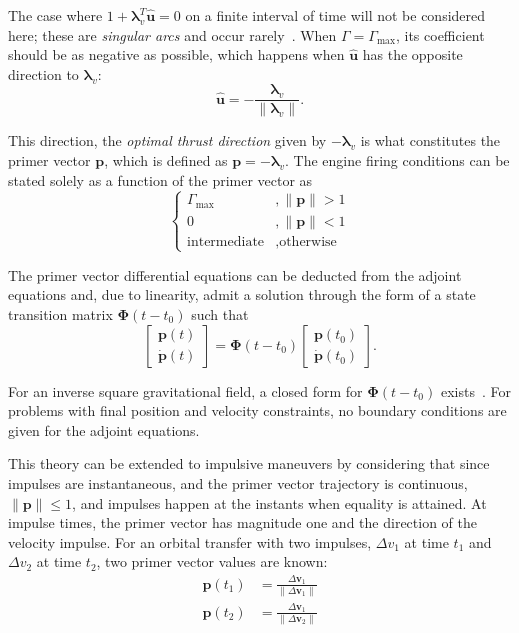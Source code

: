 The case where \(1 + \mathbf{\lambda}_v^T \hat{\mathbf{u}} = 0\) on a finite interval of time will not be considered here; these are \textit{singular arcs} and occur rarely~\cite{singular_arcs}. When \(\Gamma = \Gamma_{\max}\), its coefficient should be as negative as possible, which happens when \(\hat{\mathbf{u}}\) has the opposite direction to \(\mathbf{\lambda}_v\):
\begin{equation}
    \hat{\mathbf{u}} = - \frac{\mathbf{\lambda}_v}{\lVert \mathbf{\lambda}_v \rVert}.
\end{equation}

This direction, the \textit{optimal thrust direction} given by \(-\mathbf{\lambda}_v\) is what constitutes the primer vector \(\mathbf{p}\), which is defined as \(\mathbf{p} = -\mathbf{\lambda}_v\). The engine firing conditions can be stated solely as a function of the primer vector as~\cite{Conway_2010}
\begin{equation}
    \begin{cases}
        \Gamma_{\max}&, \lVert \mathbf{p} \rVert > 1 \\
        0&, \lVert \mathbf{p} \rVert < 1 \\
        \text{intermediate}&, \text{otherwise}
    \end{cases}
\end{equation}

The primer vector differential equations can be deducted from the adjoint equations and, due to linearity, admit a solution through the form of a state transition matrix \(\mathbf{\Phi}(t - t_0)\) such that
\begin{equation}
    \begin{bmatrix}
        \mathbf{p}(t) \\ \dot{\mathbf{p}}(t)
    \end{bmatrix} = \mathbf{\Phi}(t - t_0) \begin{bmatrix}
        \mathbf{p}(t_0) \\ \dot{\mathbf{p}}(t_0)
    \end{bmatrix}.
\end{equation}

For an inverse square gravitational field, a closed form for \(\mathbf{\Phi}(t-t_0)\) exists~\cite{glandorf_transition_matrix}. For problems with final position and velocity constraints, no boundary conditions are given for the adjoint equations.

This theory can be extended to impulsive maneuvers by considering that since impulses are instantaneous, and the primer vector trajectory is continuous, \(\lVert \mathbf{p} \rVert \leq 1\), and impulses happen at the instants when equality is attained. At impulse times, the primer vector has magnitude one and the direction of the velocity impulse. For an orbital transfer with two impulses, \(\Delta v_1\) at time \(t_1\) and \(\Delta v_2\) at time \(t_2\), two primer vector values are known:
\begin{align}
    \mathbf{p}(t_1) &= \frac{\Delta \mathbf{v}_1}{\lVert \Delta \mathbf{v}_1 \rVert} \\
    \mathbf{p}(t_2) &= \frac{\Delta \mathbf{v}_1}{\lVert \Delta \mathbf{v}_2 \rVert}
\end{align}

